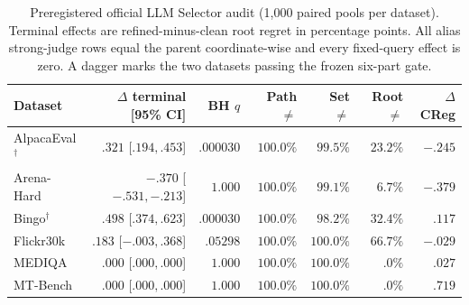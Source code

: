 \begin{table}[H]
\centering
\caption{Preregistered official LLM Selector audit (1,000 paired pools per dataset). Terminal effects are refined-minus-clean root regret in percentage points. All alias strong-judge rows equal the parent coordinate-wise and every fixed-query effect is zero. A dagger marks the two datasets passing the frozen six-part gate.}
\label{tab:step88}
\scriptsize
\setlength{\tabcolsep}{3.2pt}
\begin{tabular}{@{}lrrrrrr@{}}
\toprule
Dataset & $\Delta$ terminal [95\% CI] & BH $q$ & Path $\neq$ & Set $\neq$ & Root $\neq$ & $\Delta$CReg \\
\midrule
AlpacaEval$^\dagger$ & $.321$ [$ .194,.453$] & $.000030$ & $100.0\%$ & $99.5\%$ & $23.2\%$ & $-.245$ \\
Arena-Hard & $-.370$ [$-.531,-.213$] & $1.000$ & $100.0\%$ & $99.1\%$ & $6.7\%$ & $-.379$ \\
Bingo$^\dagger$ & $.498$ [$ .374,.623$] & $.000030$ & $100.0\%$ & $98.2\%$ & $32.4\%$ & $.117$ \\
Flickr30k & $.183$ [$-.003,.368$] & $.05298$ & $100.0\%$ & $100.0\%$ & $66.7\%$ & $-.029$ \\
MEDIQA & $.000$ [$ .000,.000$] & $1.000$ & $100.0\%$ & $100.0\%$ & $.0\%$ & $.027$ \\
MT-Bench & $.000$ [$ .000,.000$] & $1.000$ & $100.0\%$ & $100.0\%$ & $.0\%$ & $.719$ \\
\bottomrule
\end{tabular}
\end{table}
